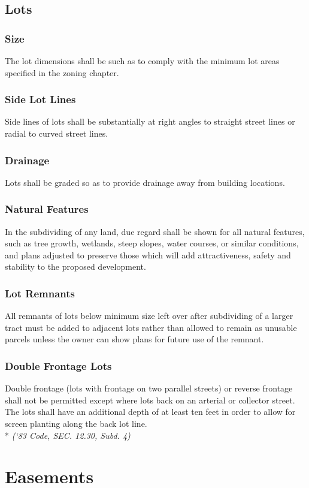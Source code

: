 \subsection{Lots}
\subsubsection{Size}
The lot dimensions shall be such as to comply with the minimum lot areas specified in the zoning chapter.
\subsubsection{Side Lot Lines}
Side lines of lots shall be substantially at right angles to straight street lines or radial to curved street lines.
\subsubsection{Drainage}
Lots shall be graded so as to provide drainage away from building locations.
\subsubsection{Natural Features}
In the subdividing of any land, due regard shall be shown for all natural features, such as tree growth, wetlands, steep slopes, water courses, or similar conditions, and plans adjusted to preserve those which will add attractiveness, safety and stability to the proposed development.
\subsubsection{Lot Remnants}
All remnants of lots below minimum size left over after subdividing of a larger tract must be added to adjacent lots rather than allowed to remain as unusable parcels unless the owner can show plans for future use of the remnant.
\subsubsection{Double Frontage Lots}
Double frontage (lots with frontage on two parallel streets) or reverse frontage shall not be permitted except where lots back on an arterial or collector street.  The lots shall have an additional depth of at least ten feet in order to allow for screen planting along the back lot line.\\*
\emph{(‘83 Code, SEC. 12.30, Subd. 4)}
\section{Easements}
